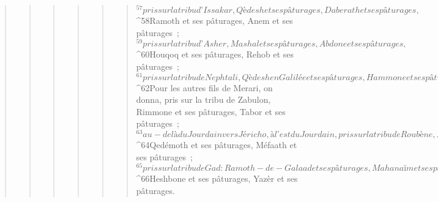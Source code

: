 \begin{verse}
\begin{verse}
\begin{verse}
\begin{verse}
\begin{verse}
\begin{verse}
${}^{57}pris sur la tribu d’Issakar, Qèdesh et ses pâturages, Daberath et ses pâturages, 
${}^{58}Ramoth et ses pâturages, Anem et ses pâturages ; 
${}^{59}pris sur la tribu d’Asher, Mashal et ses pâturages, Abdone et ses pâturages, 
${}^{60}Houqoq et ses pâturages, Rehob et ses pâturages ; 
${}^{61}pris sur la tribu de Nephtali, Qèdesh en Galilée et ses pâturages, Hammone et ses pâturages, Qiryataïm et ses pâturages.
${}^{62}Pour les autres fils de Merari, on donna, pris sur la tribu de Zabulon, Rimmone et ses pâturages, Tabor et ses pâturages ; 
${}^{63}au-delà du Jourdain vers Jéricho, à l’est du Jourdain, pris sur la tribu de Roubène, Bècèr dans le désert et ses pâturages, Yahça et ses pâturages, 
${}^{64}Qedémoth et ses pâturages, Méfaath et ses pâturages ; 
${}^{65}pris sur la tribu de Gad : Ramoth-de-Galaad et ses pâturages, Mahanaïm et ses pâturages, 
${}^{66}Heshbone et ses pâturages, Yazèr et ses pâturages.
      

\end{verse}
\end{verse}
\end{verse}
\end{verse}
\end{verse}
\end{verse}
